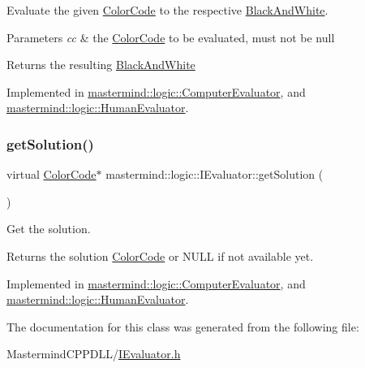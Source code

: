Evaluate the given \hyperlink{classmastermind_1_1logic_1_1_color_code}{Color\+Code} to the respective \hyperlink{classmastermind_1_1logic_1_1_black_and_white}{Black\+And\+White}. 


\begin{DoxyParams}{Parameters}
{\em cc} & the \hyperlink{classmastermind_1_1logic_1_1_color_code}{Color\+Code} to be evaluated, must not be {\ttfamily null} \\
\hline
\end{DoxyParams}
\begin{DoxyReturn}{Returns}
the resulting \hyperlink{classmastermind_1_1logic_1_1_black_and_white}{Black\+And\+White} 
\end{DoxyReturn}


Implemented in \hyperlink{classmastermind_1_1logic_1_1_computer_evaluator_a65f4a9bafcd5240e0cf92f6398025bd5}{mastermind\+::logic\+::\+Computer\+Evaluator}, and \hyperlink{classmastermind_1_1logic_1_1_human_evaluator_a12080bafb5e428db8cf8b8173821f83d}{mastermind\+::logic\+::\+Human\+Evaluator}.

\hypertarget{classmastermind_1_1logic_1_1_i_evaluator_a544ecf5ba1d2cb5708e62fc508d341f3}{}\label{classmastermind_1_1logic_1_1_i_evaluator_a544ecf5ba1d2cb5708e62fc508d341f3} 
\subsubsection{\texorpdfstring{get\+Solution()}{getSolution()}}
{\footnotesize\ttfamily virtual \hyperlink{classmastermind_1_1logic_1_1_color_code}{Color\+Code}$\ast$ mastermind\+::logic\+::\+I\+Evaluator\+::get\+Solution (\begin{DoxyParamCaption}{ }\end{DoxyParamCaption})\hspace{0.3cm}{\ttfamily [pure virtual]}}



Get the solution. 

\begin{DoxyReturn}{Returns}
the solution \hyperlink{classmastermind_1_1logic_1_1_color_code}{Color\+Code} or N\+U\+LL if not available yet. 
\end{DoxyReturn}


Implemented in \hyperlink{classmastermind_1_1logic_1_1_computer_evaluator_ac6e0423a5ef2f6679cfe6be75d3a09dd}{mastermind\+::logic\+::\+Computer\+Evaluator}, and \hyperlink{classmastermind_1_1logic_1_1_human_evaluator_ab369895151e4702e8b57d74c8f6869db}{mastermind\+::logic\+::\+Human\+Evaluator}.



The documentation for this class was generated from the following file\+:\begin{DoxyCompactItemize}
\item 
Mastermind\+C\+P\+P\+D\+L\+L/\hyperlink{_i_evaluator_8h}{I\+Evaluator.\+h}\end{DoxyCompactItemize}
